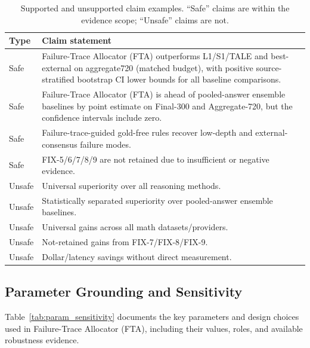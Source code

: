 \documentclass[smallcondensed]{svjour3}
\begin{document}
\begin{table}[H]
\centering
\caption{Supported and unsupported claim examples. ``Safe'' claims are within the evidence scope; ``Unsafe'' claims are not.}
\label{tab:claim_language}
\small
\begin{tabular}{lp{}}
\toprule
Type & Claim statement \\
\midrule
Safe & Failure-Trace Allocator (FTA) outperforms L1/S1/TALE and best-external on aggregate720 (matched budget), with positive source-stratified bootstrap CI lower bounds for all baseline comparisons. \\
Safe & Failure-Trace Allocator (FTA) is ahead of pooled-answer ensemble baselines by point estimate on Final-300 and Aggregate-720, but the confidence intervals include zero. \\
Safe & Failure-trace-guided gold-free rules recover low-depth and external-consensus failure modes. \\
Safe & FIX-5/6/7/8/9 are not retained due to insufficient or negative evidence. \\
Unsafe & Universal superiority over all reasoning methods. \\
Unsafe & Statistically separated superiority over pooled-answer ensemble baselines. \\
Unsafe & Universal gains across all math datasets/providers. \\
Unsafe & Not-retained gains from FIX-7/FIX-8/FIX-9. \\
Unsafe & Dollar/latency savings without direct measurement. \\
\bottomrule
\end{tabular}
\end{table}

\clearpage
\subsection*{Parameter Grounding and Sensitivity}

Table~\ref{tab:param_sensitivity} documents the key parameters and design choices
used in Failure-Trace Allocator (FTA), including their values, roles, and available robustness evidence.
\end{document}
